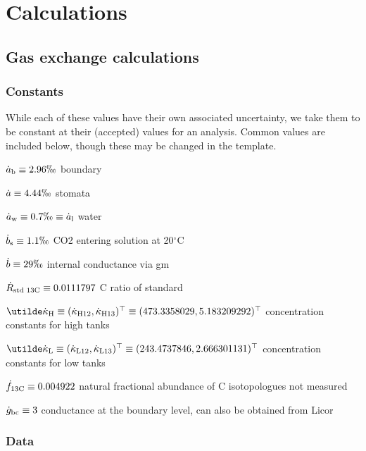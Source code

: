 \renewcommand{\ADAfilename}{tdl_calc} %
\chapter{Calculations}
\label{ch:tdllicor_calculations}


\section{Gas exchange calculations}

\subsection{Constants}

While each of these values have their own associated uncertainty,
  we take them to be constant at their (accepted) values for an analysis.
Common values are included below, though these may be changed in the template.


$\sdotab\equiv 2.96 \permil   $ boundary

$\sdota\equiv 4.44 \permil    $ stomata

$\sdotaw\equiv 0.7 \permil \equiv \sdotal   $ water

$\sdotbs\equiv 1.1 \permil    $ CO2 entering solution at 20$^\circ$C

$\sdotb\equiv 29 \permil      $ internal conductance via gm

$\dot{R}_\textrm{std 13C}\equiv 0.0111797    $ C ratio of standard

$\vdotkappaHtw
  \equiv (\sdotkappaHtw, \sdotkappaHth)^\transpose
  \equiv (473.3358029, 5.183209292)^\transpose      $ concentration constants for high tanks

$\vdotkappaLtw
  \equiv (\sdotkappaLtw, \sdotkappaLth)^\transpose
  \equiv (243.4737846, 2.666301131)^\transpose      $ concentration constants for low  tanks

$\dot{f}_{\textrm{13C}}\equiv 0.004922     $ natural fractional abundance of C isotopologues not measured

$\dot{g}_{\textrm{bc}}\equiv 3$  conductance at the boundary level, can also be obtained from Licor


\subsection{Data}

